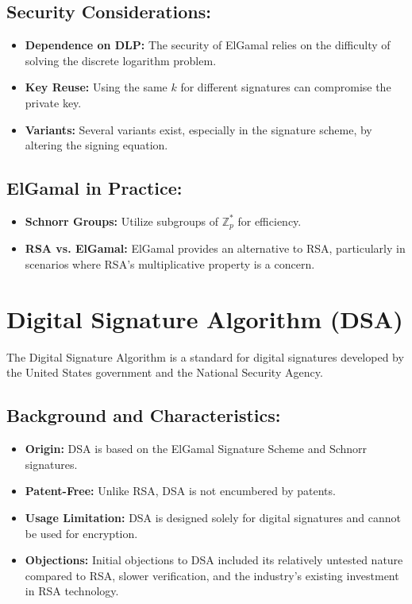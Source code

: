 \documentclass[12pt]{article}
\begin{document}
\subsection*{Security Considerations:}
\begin{itemize}
    \item \textbf{Dependence on DLP:} The security of ElGamal relies on the difficulty of solving the discrete logarithm problem.
    \item \textbf{Key Reuse:} Using the same \( k \) for different signatures can compromise the private key.
    \item \textbf{Variants:} Several variants exist, especially in the signature scheme, by altering the signing equation.
\end{itemize}

\subsection*{ElGamal in Practice:}
\begin{itemize}
    \item \textbf{Schnorr Groups:} Utilize subgroups of \( \mathbb{Z}_p^* \) for efficiency.
    \item \textbf{RSA vs. ElGamal:} ElGamal provides an alternative to RSA, particularly in scenarios where RSA's multiplicative property is a concern.
\end{itemize}

\section*{Digital Signature Algorithm (DSA)}

The Digital Signature Algorithm is a standard for digital signatures developed by the United States government and the National Security Agency.

\subsection*{Background and Characteristics:}
\begin{itemize}
    \item \textbf{Origin:} DSA is based on the ElGamal Signature Scheme and Schnorr signatures. 
    \item \textbf{Patent-Free:} Unlike RSA, DSA is not encumbered by patents.
    \item \textbf{Usage Limitation:} DSA is designed solely for digital signatures and cannot be used for encryption.
    \item \textbf{Objections:} Initial objections to DSA included its relatively untested nature compared to RSA, slower verification, and the industry's existing investment in RSA technology.
\end{itemize}
\end{document}
